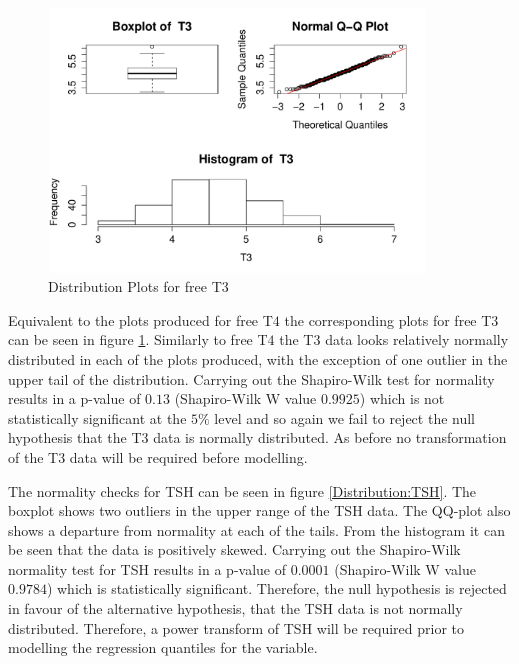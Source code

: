 \documentclass[12pt,a4paper]{report}
\begin{document}
\begin{figure}[ht]\centering
    \includegraphics[width=10cm, height=7cm]{NormT3.pdf}
    \caption{Distribution Plots for free T3}
    \label{Distribution:T3}
\end{figure}
\vspace{2mm}

Equivalent to the plots produced for free T$4$ the corresponding plots for free T$3$ can be seen in figure \ref{Distribution:T3}. Similarly to free T$4$ the T$3$ data looks relatively normally distributed in each of the plots produced, with the exception of one outlier in the upper tail of the distribution. Carrying out the Shapiro-Wilk test for normality results in a p-value of $0.13$ (Shapiro-Wilk W value $0.9925$) which is not statistically significant at the $5\%$ level and so again we fail to reject the null hypothesis that the T$3$ data is normally distributed. As before no transformation of the T$3$ data will be required before modelling.
\vspace{2mm}

The normality checks for TSH can be seen in figure \ref{Distribution:TSH}. The boxplot shows two outliers in the upper range of the TSH data. The QQ-plot also shows a departure from normality at each of the tails. From the histogram it can be seen that the data is positively skewed. Carrying out the Shapiro-Wilk  normality test for TSH results in a p-value of $0.0001$ (Shapiro-Wilk W value $0.9784$) which is statistically significant. Therefore, the null hypothesis is rejected in favour of the alternative hypothesis, that the TSH data is not normally distributed. Therefore, a power transform of TSH will be required prior to modelling the regression quantiles for the variable.
\end{document}
